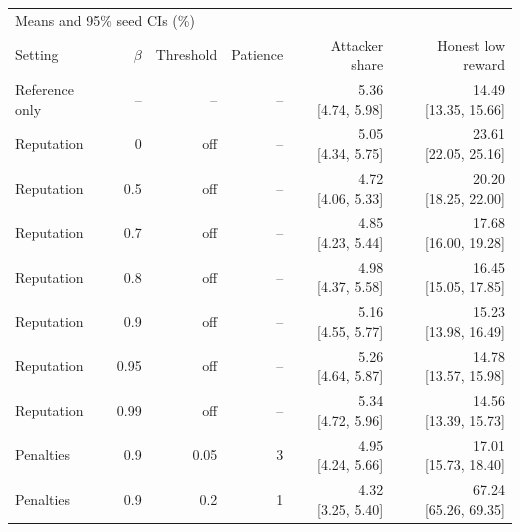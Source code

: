 \begin{tabular}{lrrrrr}
\toprule
\multicolumn{6}{l}{Means and 95\% seed CIs (\%)} \\
Setting & $\beta$ & Threshold & Patience & Attacker share & Honest low reward \\
\midrule
Reference only & -- & -- & -- & \shortstack{5.36\\{}[4.74, 5.98]} & \shortstack{14.49\\{}[13.35, 15.66]} \\
Reputation & 0 & off & -- & \shortstack{5.05\\{}[4.34, 5.75]} & \shortstack{23.61\\{}[22.05, 25.16]} \\
Reputation & 0.5 & off & -- & \shortstack{4.72\\{}[4.06, 5.33]} & \shortstack{20.20\\{}[18.25, 22.00]} \\
Reputation & 0.7 & off & -- & \shortstack{4.85\\{}[4.23, 5.44]} & \shortstack{17.68\\{}[16.00, 19.28]} \\
Reputation & 0.8 & off & -- & \shortstack{4.98\\{}[4.37, 5.58]} & \shortstack{16.45\\{}[15.05, 17.85]} \\
Reputation & 0.9 & off & -- & \shortstack{5.16\\{}[4.55, 5.77]} & \shortstack{15.23\\{}[13.98, 16.49]} \\
Reputation & 0.95 & off & -- & \shortstack{5.26\\{}[4.64, 5.87]} & \shortstack{14.78\\{}[13.57, 15.98]} \\
Reputation & 0.99 & off & -- & \shortstack{5.34\\{}[4.72, 5.96]} & \shortstack{14.56\\{}[13.39, 15.73]} \\
Penalties & 0.9 & 0.05 & 3 & \shortstack{4.95\\{}[4.24, 5.66]} & \shortstack{17.01\\{}[15.73, 18.40]} \\
Penalties & 0.9 & 0.2 & 1 & \shortstack{4.32\\{}[3.25, 5.40]} & \shortstack{67.24\\{}[65.26, 69.35]} \\

\end{tabular}
